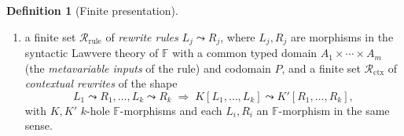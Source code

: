 \documentclass[11pt]{article}
\theoremstyle{plain}
\theoremstyle{definition}
\newtheorem{definition}[theorem]{Definition}
\theoremstyle{remark}
\newcommand{\rew}{\leadsto}
\begin{document}
\begin{definition}[Finite presentation]
\begin{enumerate}[leftmargin=*]
        representatives of equivalence classes; we further require that
        $E^{\downarrow}$ has the \emph{finite variant property} (FVP) of
        Escobar--Meseguer--Sasse~\cite{EscobarMeseguerSasse2008}: for every
        $\mathbb{F}$-term $t$ the set
        \[
          \mathsf{Var}_{E}(t)
          \;:=\;
          \bigl\{ (t\sigma)\!\downarrow_{E^{\downarrow}}
                  \;:\; \sigma \text{ a substitution} \bigr\}
        \]
        is finite up to renaming of metavariables. FVP makes
        $E$-matching --- ``does $P\sigma =_E T$ for some $\sigma$?'' ---
        decidable via folding variant
        narrowing~\cite{EscobarSasseMeseguer2012}, and is enjoyed by all
        standard structural theories (AC, ACI, abelian groups,
        exclusive-or);\footnote{Without FVP, $E$-matching is in general
        undecidable even when $E^{\downarrow}$ is convergent, so KB
        alone is insufficient for the compiler to decide whether a
        subject term has an $E$-equivalent matching a rule's left-hand
        side. Alternative sufficient conditions (left-linearity plus
        termination of basic narrowing; shallow $E$; right-ground $E$)
        also work, but FVP is the cleanest single hypothesis.}
  \item a finite set $\mathcal{R}_{\mathrm{rule}}$ of \emph{rewrite rules}
        $L_j \rew R_j$, where $L_j, R_j$ are morphisms in the syntactic
        Lawvere theory of $\mathbb{F}$ with a common typed domain
        $A_1 \times \cdots \times A_m$ (the \emph{metavariable inputs}
        of the rule) and codomain $P$, and a finite set
        $\mathcal{R}_{\mathrm{ctx}}$ of \emph{contextual rewrites} of the
        shape
        \[
          L_1 \rew R_1, \ldots, L_k \rew R_k
            \;\Rightarrow\; K[L_1,\ldots,L_k] \rew K'[R_1,\ldots,R_k],
        \]
        with $K, K'$ $k$-hole $\mathbb{F}$-morphisms and each $L_i, R_i$
        an $\mathbb{F}$-morphism in the same sense.


\end{enumerate}
\end{definition}
\end{document}
